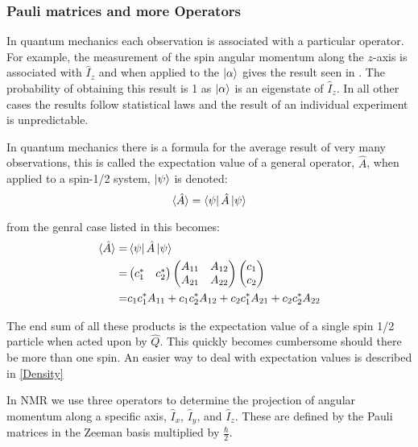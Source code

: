\subsubsection{Pauli matrices and more Operators}

In quantum mechanics each observation is associated with a particular operator. For
example, the measurement of the spin angular momentum along the $z$-axis is associated with
$\hat{I}_z$ and when applied to the $\ket{\alpha}$ gives the result seen in . The
probability of obtaining this result is 1 as $\ket{\alpha}$ is an eigenstate of $\hat{I}_z$. In
all other cases the results follow statistical laws and the result of an individual experiment
is unpredictable.

In quantum mechanics there is a formula for the average result of very many observations, this is
called the expectation value of a general operator, $\hat{A}$, when applied to a spin-1/2 system, $\ket{\psi}$
is denoted:
\begin{equation}
  \langle\hat{A}\rangle = \bra{\psi}\hat{A}\ket{\psi}
\end{equation}

from the genral case listed in  this becomes:
\begin{align}\label{eqn:expectation}
  \langle\hat{A}\rangle =& \bra{\psi}\hat{A}\ket{\psi}\\
  =& \begin{pmatrix}
    c_1^* & c_2^*
\end{pmatrix}
\begin{pmatrix}
A_{11} & A_{12}\\
A_{21} & A_{22}
\end{pmatrix}
\begin{pmatrix}
  c_1\\
  c_2
\end{pmatrix}\\
=& c_1c_1^*A_{11} + c_1c_2^*A_{12} + c_2c_1^*A_{21} + c_2c_2^*A_{22}
\end{align}

The end sum of all these products is the expectation value of a single spin 1/2 particle when
acted upon by $\hat{Q}$. This quickly becomes cumbersome should there be more than one spin. An easier
way to deal with expectation values is described in \ref{Density}

In NMR we use three operators to determine the projection of angular momentum along a
specific axis, $\hat{I}_x$, $\hat{I}_y$, and $\hat{I}_z$. These are defined by the
Pauli matrices in the Zeeman basis multiplied by $\frac{\hbar}{2}$.

